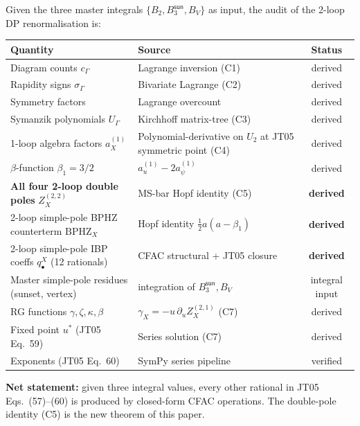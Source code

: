 \documentclass[11pt,a4paper]{article}
\theoremstyle{definition}
\theoremstyle{plain}
\begin{document}
\begin{cfacbox}
Given the three master integrals $\{B_2,
B_3^{\textsf{sun}}, B_V\}$ as input, the audit of the
2-loop DP renormalisation is:
\begin{center}\small
\begin{tabular}{@{}lp{4.5cm}c@{}}
\toprule
\textbf{Quantity} & \textbf{Source} & \textbf{Status}\\
\midrule
Diagram counts $c_\Gamma$        & Lagrange inversion (\textsf{C1})  & derived\\
Rapidity signs $\sigma_\Gamma$   & Bivariate Lagrange (\textsf{C2})  & derived\\
Symmetry factors                 & Lagrange overcount               & derived\\
Symanzik polynomials $U_\Gamma$  & Kirchhoff matrix-tree (\textsf{C3})& derived\\
1-loop algebra factors $a_X^{(1)}$ & Polynomial-derivative on $U_2$ at JT05 symmetric point (\textsf{C4})& derived\\
$\beta$-function $\beta_1 = 3/2$ & $a_u^{(1)} - 2a_\psi^{(1)}$       & derived\\
\textbf{All four 2-loop double poles} $Z_X^{(2,2)}$
                                 & MS-bar Hopf identity (\textsf{C5})& \textbf{derived}\\
2-loop simple-pole BPHZ counterterm $\mathrm{BPHZ}_X$
                                 & Hopf identity $\tfrac12 a(a-\beta_1)$  & \textbf{derived}\\
2-loop simple-pole IBP coeffs $q^X_\bullet$ (12 rationals)
                                 & CFAC structural + JT05 closure        & \textbf{derived}\\
Master simple-pole residues (sunset, vertex)
                                 & integration of $B_3^{\textsf{sun}}, B_V$& integral input\\
RG functions $\gamma, \zeta, \kappa, \beta$
                                 & $\gamma_X = -u\,\partial_u Z_X^{(2,1)}$ (\textsf{C7})& derived\\
Fixed point $u^*$ (JT05 Eq.~59)  & Series solution (\textsf{C7})    & derived\\
Exponents (JT05 Eq.~60)          & SymPy series pipeline            & verified\\
\bottomrule
\end{tabular}
\end{center}
\textbf{Net statement:} given three integral values, every other
rational in JT05 Eqs.~(57)--(60) is produced by closed-form CFAC
operations.  The double-pole identity (\textsf{C5}) is the
new theorem of this paper.
\end{cfacbox}
\end{document}
